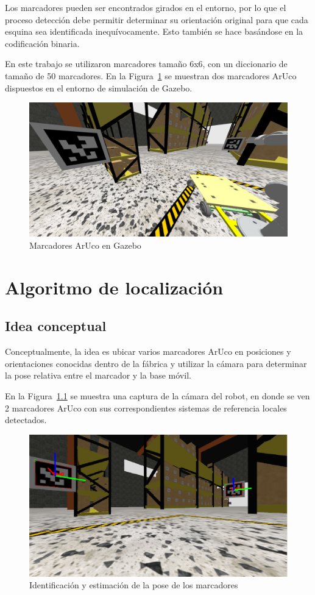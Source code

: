 \documentclass[12pt, a4paper]{report}
\begin{document}
			Los marcadores pueden ser encontrados girados en el entorno, por lo que el proceso detección debe permitir determinar su orientación original para que cada esquina sea identificada inequívocamente.
			Esto también se hace basándose en la codificación binaria.

			En este trabajo se utilizaron marcadores tamaño 6x6, con un diccionario de tamaño de 50 marcadores.
			En la Figura~\ref{fig:aruco} se muestran dos marcadores ArUco dispuestos en el entorno de simulación de Gazebo.
			\begin{figure}[H]
				\centering
				\includegraphics[width=0.9\linewidth]{img/aruco}
				\caption[Carrolac]{Marcadores ArUco en Gazebo}
				\label{fig:aruco}
			\end{figure}

	\chapter{Algoritmo de localización}\label{ch:algoritmo-localizacion}
		\section{Idea conceptual}\label{sec:algoritmo-localizacion/idea-conceptual}
			Conceptualmente, la idea es ubicar varios marcadores ArUco en posiciones y orientaciones conocidas dentro de la fábrica y utilizar la cámara para determinar la pose relativa entre el marcador y la base móvil.

			En la Figura~\ref{fig:cv_aruco} se muestra una captura de la cámara del robot, en donde se ven 2 marcadores ArUco con sus correspondientes sistemas de referencia locales detectados.
			\begin{figure}[H]
				\centering
				\includegraphics[width=0.9\linewidth]{img/cv_aruco}
				\caption[Carrolac]{Identificación y estimación de la pose de los marcadores}
				\label{fig:cv_aruco}
			\end{figure}
\end{document}
